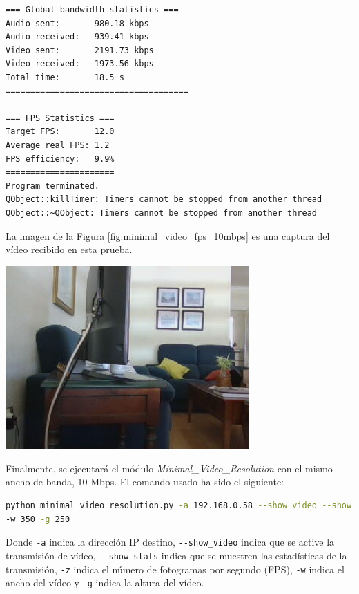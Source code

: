 \begin{lstlisting}[language=bash,basicstyle=\ttfamily\tiny]
=== Global bandwidth statistics ===
Audio sent:       980.18 kbps
Audio received:   939.41 kbps
Video sent:       2191.73 kbps
Video received:   1973.56 kbps
Total time:       18.5 s
=====================================

=== FPS Statistics ===
Target FPS:       12.0
Average real FPS: 1.2
FPS efficiency:   9.9%
======================
Program terminated.
QObject::killTimer: Timers cannot be stopped from another thread
QObject::~QObject: Timers cannot be stopped from another thread
\end{lstlisting}
\vspace{\baselineskip}

\newpage

La imagen de la Figura \ref{fig:minimal_video_fps_10mbps} es una captura del vídeo recibido en esta prueba.
\begin{center}
  \includegraphics[width = 0.7\textwidth]{images/VideoRecibido2.2.png}
  \label{fig:minimal_video_fps_10mbps}
\end{center}

\newpage

Finalmente, se ejecutará el módulo \textit{Minimal\_Video\_Resolution} con el mismo ancho de banda, 10 Mbps. El comando usado ha sido el siguiente:
\begin{lstlisting}[language=bash,basicstyle=\ttfamily\scriptsize]
python minimal_video_resolution.py -a 192.168.0.58 --show_video --show_stats -z 12 \\
-w 350 -g 250
\end{lstlisting}
Donde \verb|-a| indica la dirección IP destino, \verb|--show_video| indica que se active la transmisión de vídeo, \verb|--show_stats| indica que se muestren las estadísticas de la transmisión, \verb|-z| indica el número de fotogramas por segundo (FPS), \verb|-w| indica el ancho del vídeo y \verb|-g| indica la altura del vídeo.
\vspace{\baselineskip}

